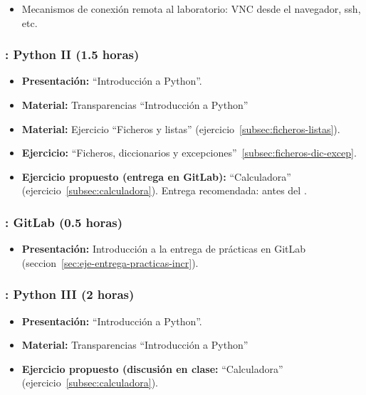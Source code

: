 \documentclass[a4paper,12pt]{article}
\begin{document}
\begin{itemize}
\item Mecanismos de conexión remota al laboratorio: VNC desde el navegador, ssh, etc.
\end{itemize}

\subsubsection{\lunesB: Python II (1.5 horas)}
\label{cal:lunesB}

\begin{itemize}
\item \textbf{Presentación:} ``Introducción a Python''.
\item \textbf{Material:} Transparencias ``Introducción a Python''
\item \textbf{Material:} Ejercicio ``Ficheros y listas'' (ejercicio~\ref{subsec:ficheros-listas}).
\item \textbf{Ejercicio:} ``Ficheros, diccionarios y excepciones''~\ref{subsec:ficheros-dic-excep}.
\item \textbf{Ejercicio propuesto (entrega en GitLab):} ``Calculadora'' (ejercicio~\ref{subsec:calculadora}).
   Entrega recomendada: antes del \lunesC.
\end{itemize}

\subsubsection{\lunesB: GitLab (0.5 horas)}
\label{cal:lunesBb}

\begin{itemize}
\item \textbf{Presentación:} Introducción a la entrega de prácticas en GitLab (seccion~\ref{sec:eje-entrega-practicas-incr}).
\end{itemize}

\subsubsection{\lunesC: Python III (2 horas)}
\label{cal:lunesC}

\begin{itemize}
\item \textbf{Presentación:} ``Introducción a Python''.
\item \textbf{Material:} Transparencias ``Introducción a Python''

\item \textbf{Ejercicio propuesto (discusión en clase:} ``Calculadora'' (ejercicio~\ref{subsec:calculadora}).

\end{itemize}
\end{document}
